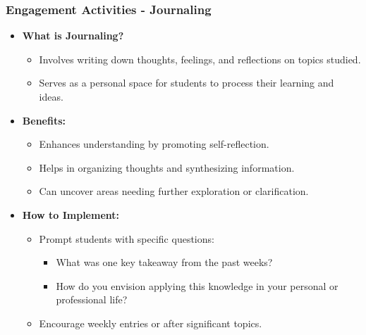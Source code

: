 \documentclass[aspectratio=169]{beamer}
\begin{document}
\begin{frame}[fragile]
    \frametitle{Engagement Activities - Journaling}
    \begin{itemize}
        \item \textbf{What is Journaling?}
        \begin{itemize}
            \item Involves writing down thoughts, feelings, and reflections on topics studied.
            \item Serves as a personal space for students to process their learning and ideas.
        \end{itemize}
        
        \item \textbf{Benefits:}
        \begin{itemize}
            \item Enhances understanding by promoting self-reflection.
            \item Helps in organizing thoughts and synthesizing information.
            \item Can uncover areas needing further exploration or clarification.
        \end{itemize}

        \item \textbf{How to Implement:}
        \begin{itemize}
            \item Prompt students with specific questions:
            \begin{itemize}
                \item What was one key takeaway from the past weeks?
                \item How do you envision applying this knowledge in your personal or professional life?
            \end{itemize}
            \item Encourage weekly entries or after significant topics.
        \end{itemize}
    \end{itemize}
\end{frame}
\end{document}
